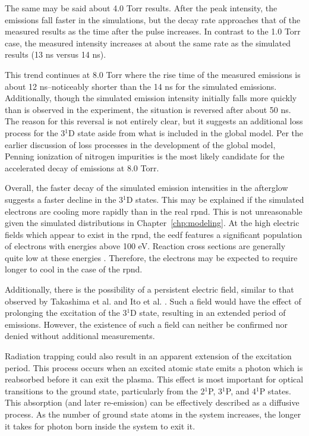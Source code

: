 The same may be said about 4.0 Torr results. After the peak intensity, the
emissions fall faster in the simulations, but the decay rate approaches that of
the measured results as the time after the pulse increases. In contrast to the
1.0 Torr case, the measured intensity increases at about the same rate as the
simulated results (13 ns versus 14 ns).

This trend continues at 8.0 Torr where the rise time of the measured emissions
is about 12 ns--noticeably shorter than the 14 ns for the simulated emissions.
Additionally, though the simulated emission intensity initially falls more
quickly than is observed in the experiment, the situation is reversed after
about 50 ns. The reason for this reversal is not entirely clear, but it suggests
an additional loss process for the 3$^1$D state aside from what is included in
the global model. Per the earlier discussion of loss processes in the
development of the global model, Penning ionization of nitrogen impurities is
the most likely candidate for the accelerated decay of emissions at 8.0 Torr.

Overall, the faster decay of the simulated emission intensities in the afterglow
suggests a faster decline in the 3$^1$D states. This may be explained if the
simulated electrons are cooling more rapidly than in the real \acs{rpnd}. This
is not unreasonable given the simulated distributions in
Chapter~\ref{chp:modeling}. At the high electric fields which appear to exist in
the \acs{rpnd}, the \acs{eedf} features a significant population of electrons
with energies above 100 eV. Reaction cross sections are generally quite low at
these energies \cite{Ralchenko2008}. Therefore, the electrons may be expected to
require longer to cool in the case of the \acs{rpnd}.

Additionally, there is the possibility of a persistent electric field, similar
to that observed by Takashima et al. \cite{Takashima2011} and Ito et al.
\cite{Ito2010}. Such a field would have the effect of prolonging the excitation
of the 3$^1$D state, resulting in an extended period of emissions. However, the
existence of such a field can neither be confirmed nor denied without additional
measurements.

Radiation trapping \cite{Kunze2009} could also result in an apparent extension
of the excitation period. This process occurs when an excited atomic state emits
a photon which is reabsorbed before it can exit the plasma. This effect is most
important for optical transitions to the ground state, particularly from the
2$^1$P, 3$^1$P, and 4$^1$P states. This absorption (and later re-emission) can
be effectively described as a diffusive process. As the number of ground state
atoms in the system increases, the longer it takes for photon born inside the
system to exit it.

